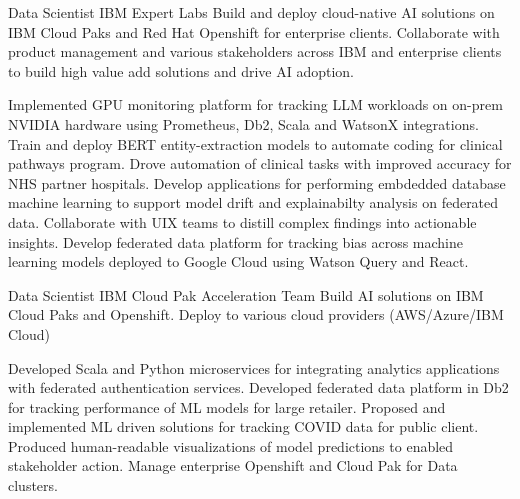 \documentclass[a4paper]{Resume}
\begin{document}


{}
        {Data Scientist}
        {IBM Expert Labs}
        {Build and deploy cloud-native AI solutions on IBM Cloud Paks and Red Hat Openshift for enterprise clients. Collaborate with product management and various stakeholders across IBM and enterprise clients to build high value add solutions and drive AI adoption.}
        \newline


{Implemented GPU monitoring platform for tracking LLM workloads on on-prem NVIDIA hardware using Prometheus, Db2, Scala and WatsonX integrations.}
{Train and deploy BERT entity-extraction models to automate coding for clinical pathways program. Drove automation of clinical tasks with improved accuracy for NHS partner hospitals.}
{Develop applications for performing embdedded database machine learning to support model drift and explainabilty analysis on federated data. Collaborate with UIX teams to distill complex findings into actionable insights. }
{Develop federated data platform for tracking bias across machine learning models deployed to Google Cloud using Watson Query and React. }


{Data Scientist}
{IBM Cloud Pak Acceleration Team}
{Build AI solutions on IBM Cloud Paks and Openshift. Deploy to various cloud providers (AWS/Azure/IBM Cloud)}

{Developed Scala and Python microservices for integrating analytics applications with federated authentication services. Developed federated data platform in Db2 for tracking performance of ML models for large retailer.}
{Proposed and implemented ML driven solutions for tracking COVID data for public client. Produced human-readable visualizations of model predictions to enabled stakeholder action. Manage enterprise Openshift and Cloud Pak for Data clusters.}
\end{document}
